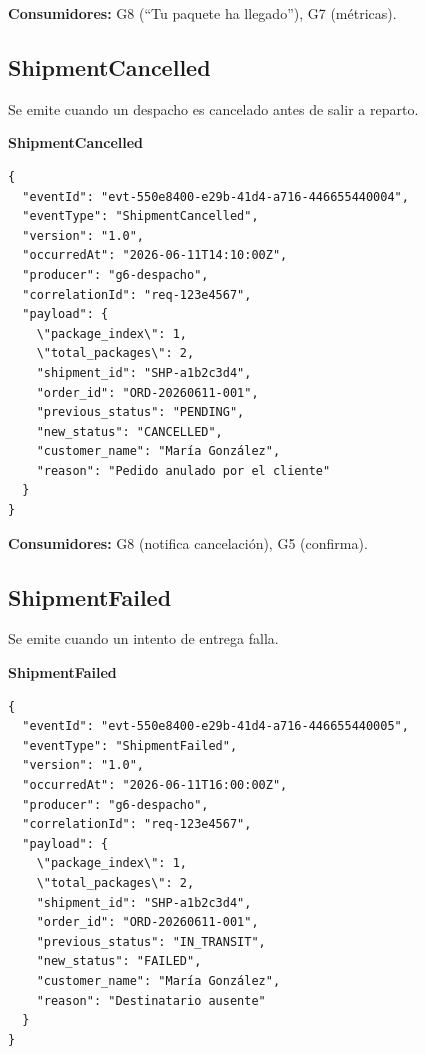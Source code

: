 \documentclass[11pt, a4paper]{article}
\newcommand{\contractheader}[1]{%
  \noindent\colorbox{primary!10}{%
    \parbox{\dimexpr\textwidth-2\fboxsep}{%
      \textbf{\faFileCode\quad #1}%
    }%
  }
  \vspace{0.3cm}
}
\begin{document}
\textbf{Consumidores:} G8 (``Tu paquete ha llegado''), G7 (métricas).

\vspace{0.4cm}

\subsection{ShipmentCancelled}

Se emite cuando un despacho es cancelado antes de salir a reparto.

\contractheader{ShipmentCancelled}

\begin{lstlisting}
{
  "eventId": "evt-550e8400-e29b-41d4-a716-446655440004",
  "eventType": "ShipmentCancelled",
  "version": "1.0",
  "occurredAt": "2026-06-11T14:10:00Z",
  "producer": "g6-despacho",
  "correlationId": "req-123e4567",
  "payload": {
    \"package_index\": 1,
    \"total_packages\": 2,
    "shipment_id": "SHP-a1b2c3d4",
    "order_id": "ORD-20260611-001",
    "previous_status": "PENDING",
    "new_status": "CANCELLED",
    "customer_name": "María González",
    "reason": "Pedido anulado por el cliente"
  }
}
\end{lstlisting}

\textbf{Consumidores:} G8 (notifica cancelación), G5 (confirma).

\vspace{0.4cm}

\subsection{ShipmentFailed}

Se emite cuando un intento de entrega falla.

\contractheader{ShipmentFailed}

\begin{lstlisting}
{
  "eventId": "evt-550e8400-e29b-41d4-a716-446655440005",
  "eventType": "ShipmentFailed",
  "version": "1.0",
  "occurredAt": "2026-06-11T16:00:00Z",
  "producer": "g6-despacho",
  "correlationId": "req-123e4567",
  "payload": {
    \"package_index\": 1,
    \"total_packages\": 2,
    "shipment_id": "SHP-a1b2c3d4",
    "order_id": "ORD-20260611-001",
    "previous_status": "IN_TRANSIT",
    "new_status": "FAILED",
    "customer_name": "María González",
    "reason": "Destinatario ausente"
  }
}
\end{lstlisting}
\end{document}
